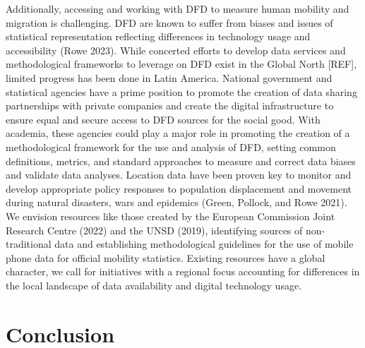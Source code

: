 \documentclass[
  11pt,
]{article}
\begin{document}
Additionally, accessing and working with DFD to measure human mobility
and migration is challenging. DFD are known to suffer from biases and
issues of statistical representation reflecting differences in
technology usage and accessibility (Rowe 2023). While concerted efforts
to develop data services and methodological frameworks to leverage on
DFD exist in the Global North {[}REF{]}, limited progress has been done
in Latin America. National government and statistical agencies have a
prime position to promote the creation of data sharing partnerships with
private companies and create the digital infrastructure to ensure equal
and secure access to DFD sources for the social good. With academia,
these agencies could play a major role in promoting the creation of a
methodological framework for the use and analysis of DFD, setting common
definitions, metrics, and standard approaches to measure and correct
data biases and validate data analyses. Location data have been proven
key to monitor and develop appropriate policy responses to population
displacement and movement during natural disasters, wars and epidemics
(Green, Pollock, and Rowe 2021). We envision resources like those
created by the European Commission Joint Research Centre (2022) and the
UNSD (2019), identifying sources of non-traditional data and
establishing methodological guidelines for the use of mobile phone data
for official mobility statistics. Existing resources have a global
character, we call for initiatives with a regional focus accounting for
differences in the local landscape of data availability and digital
technology usage.

\hypertarget{sec-conclusion}{%
\section{Conclusion}\label{sec-conclusion}}
\end{document}
